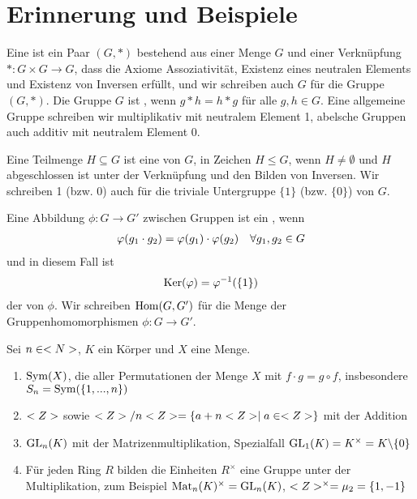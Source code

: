 \section{Erinnerung und Beispiele}

\begin{erinnerung}
	Eine  ist ein Paar $(G,\ast)$ bestehend aus einer Menge $G$ und einer Verknüpfung $\ast: G\times G\to G$, dass die Axiome Assoziativität, Existenz eines neutralen Elements und Existenz von Inversen erfüllt, und wir schreiben auch $G$ für die Gruppe $(G,\ast)$. Die Gruppe $G$ ist , wenn $g\ast h=h\ast g$ für alle $g,h\in G$. Eine allgemeine Gruppe schreiben wir multiplikativ mit neutralem Element 1, abelsche Gruppen auch additiv mit neutralem Element 0.
	
	Eine Teilmenge $H\subseteq G$ ist eine  von $G$, in Zeichen $H\le G$, wenn $H\neq\emptyset$ und $H$ abgeschlossen ist unter der Verknüpfung und den Bilden von Inversen. Wir schreiben 1 (bzw. 0) auch für die triviale Untergruppe $\{1\}$ (bzw. $\{0\}$) von $G$.
	
	Eine Abbildung $\phi:G\to G'$ zwischen Gruppen ist ein , wenn
	\begin{align}
		\phi(g_1\cdot g_2) = \phi(g_1)\cdot\phi(g_2)\quad\forall g_1,g_2\in G\notag
	\end{align}
	und in diesem Fall ist 
	\begin{align}
		\Ker(\phi) = \phi^{-1}(\{1\})\notag
	\end{align}
	der  von $\phi$. Wir schreiben $\Hom(G,G')$ für die Menge der Gruppenhomomorphismen $\phi:G\to G'$.
\end{erinnerung}

\begin{example}
	Sei $n\in\natur$, $K$ ein Körper und $X$ eine Menge.
	\begin{enumerate}[label=(\alph*)]
		\item $\Sym(X)$, die  aller Permutationen der Menge $X$ mit $f\cdot g=g\circ f$, insbesondere $S_n=\Sym(\{1,...,n\})$
		\item $\whole$ sowie $\whole/n\whole=\{a+n\whole\mid a\in\whole\}$ mit der Addition
		\item $\GL_n(K)$ mit der Matrizenmultiplikation, Spezialfall $\GL_1(K)=K^\times=K\backslash\{0\}$
		\item Für jeden Ring $R$ bilden die Einheiten $R^\times$ eine Gruppe unter der Multiplikation, zum Beispiel $\Mat_n(K)^\times=\GL_n(K)$, $\whole^\times=\mu_2=\{1,-1\}$
	\end{enumerate}
\end{example}

